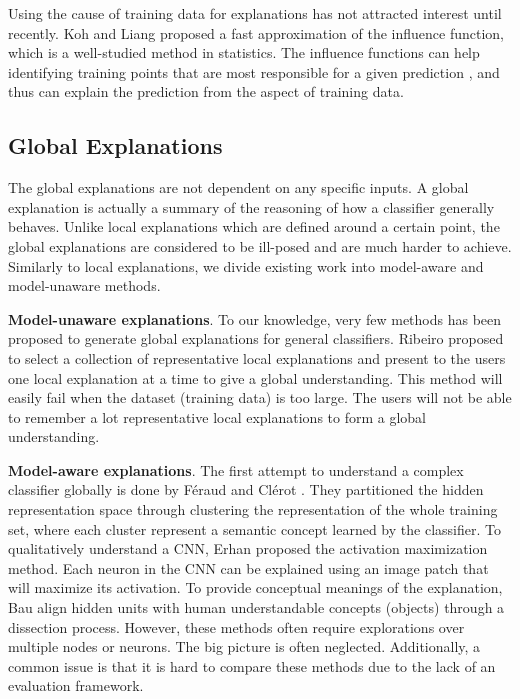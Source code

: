 
Using the cause of training data for explanations has not attracted interest until recently. Koh and Liang proposed a fast approximation of the influence function, which is a well-studied method in statistics. The influence functions can help identifying training points that are most responsible for a given prediction \cite{koh2017influencefunctions}, and thus can explain the prediction from the aspect of training data.
 
\subsection{Global Explanations}
The global explanations are not dependent on any specific inputs. A global explanation is actually a summary of the reasoning of how a classifier generally behaves. Unlike local explanations which are defined around a certain point, the global explanations are considered to be ill-posed and are much harder to achieve. Similarly to local explanations, we divide existing work into model-aware and model-unaware methods.

\textbf{Model-unaware explanations}. To our knowledge, very few methods has been proposed to generate global explanations for general classifiers. Ribeiro \etal \cite{ribeiro2016kdd} proposed to select a collection of representative local explanations and present to the users one local explanation at a time to give a global understanding. This method will easily fail when the dataset (training data) is too large. The users will not be able to remember a lot representative local explanations to form a global understanding.


\textbf{Model-aware explanations}. The first attempt to understand a complex classifier globally is done by F{\'e}raud and Cl{\'e}rot \cite{feraud2002nn}. They partitioned the hidden representation space through clustering the representation of the whole training set, where each cluster represent a semantic concept learned by the classifier. To qualitatively understand a CNN, Erhan \etal \cite{erhan2009techreport} proposed the activation maximization method. Each neuron in the CNN can be explained using an image patch that will maximize its activation. 
To provide conceptual meanings of the explanation, Bau \etal \cite{bau2017netdissect} align hidden units with human understandable concepts (objects) through a dissection process. However, these methods often require explorations over multiple nodes or neurons. The big picture is often neglected. Additionally, a common issue is that it is hard to compare these methods due to the lack of an evaluation framework.

